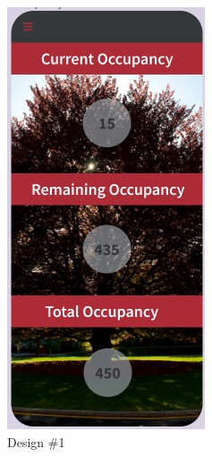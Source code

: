 \begin{figure}[H]
    \centering
    \begin{subfigure}{0.5\textwidth}
        \centering
        \includegraphics[width=0.6\linewidth]{assets/img/main_1.jpg}
        \caption{Design \#1}
        \label{fig:main_screens_1}
    \end{subfigure}%
    \begin{subfigure}{0.5\textwidth}
        \centering

\end{subfigure}
\end{figure}
